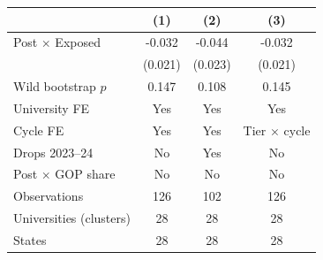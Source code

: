 \begin{tabular}{lccc}
\hline
 & (1) & (2) & (3) \\
\hline
Post $\times$ Exposed & -0.032 & -0.044 & -0.032 \\
 & (0.021) & (0.023) & (0.021) \\
Wild bootstrap $p$ & 0.147 & 0.108 & 0.145 \\
\hline
University FE & Yes & Yes & Yes \\
Cycle FE & Yes & Yes & Tier $\times$ cycle \\
Drops 2023--24 & No & Yes & No \\
Post $\times$ GOP share & No & No & No \\
Observations & 126 & 102 & 126 \\
Universities (clusters) & 28 & 28 & 28 \\
States & 28 & 28 & 28 \\
\hline
\end{tabular}
